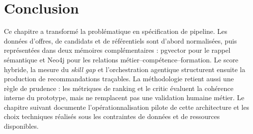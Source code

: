 \documentclass[12pt,twoside]{report}
\newcommand{\LLM}{\textsc{llm}}
\begin{document}
\section*{Conclusion}
Ce chapitre a transformé la problématique en spécification de pipeline. Les données d'offres, de candidats et de référentiels sont d'abord normalisées, puis représentées dans deux mémoires complémentaires : pgvector pour le rappel sémantique et Neo4j pour les relations métier--compétence--formation. Le score hybride, la mesure du \textit{skill gap} et l'orchestration agentique structurent ensuite la production de recommandations traçables. La méthodologie retient aussi une règle de prudence : les métriques de ranking et le critic évaluent la cohérence interne du prototype, mais ne remplacent pas une validation humaine métier. Le chapitre suivant documente l'opérationnalisation pilote de cette architecture et les choix techniques réalisés sous les contraintes de données et de ressources disponibles.




\end{document}
